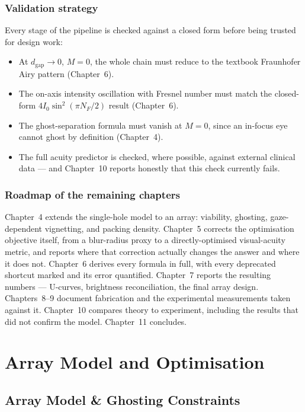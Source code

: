 \documentclass[11pt]{report}
\begin{document}
\section{Validation strategy}

Every stage of the pipeline is checked against a closed form before being trusted for
design work:
\begin{itemize}[leftmargin=1.2cm]
\item At $d_{\text{gap}} \to 0$, $M = 0$, the whole chain must reduce to the textbook
Fraunhofer Airy pattern (Chapter~6).
\item The on-axis intensity oscillation with Fresnel number must match the closed-form
$4I_0\sin^2(\pi N_F/2)$ result (Chapter~6).
\item The ghost-separation formula must vanish at $M=0$, since an in-focus eye cannot
ghost by definition (Chapter~4).
\item The full acuity predictor is checked, where possible, against external clinical data
--- and Chapter~10 reports honestly that this check currently fails.
\end{itemize}

\section{Roadmap of the remaining chapters}

Chapter~4 extends the single-hole model to an array: viability, ghosting, gaze-dependent
vignetting, and packing density. Chapter~5 corrects the optimisation objective itself, from
a blur-radius proxy to a directly-optimised visual-acuity metric, and reports where that
correction actually changes the answer and where it does not. Chapter~6 derives every
formula in full, with every deprecated shortcut marked and its error quantified. Chapter~7
reports the resulting numbers --- U-curves, brightness reconciliation, the final array
design. Chapters~8--9 document fabrication and the experimental measurements taken against
it. Chapter~10 compares theory to experiment, including the results that did not confirm
the model. Chapter~11 concludes.

\part{Array Model and Optimisation}

\chapter{Array Model \& Ghosting Constraints}
\end{document}
